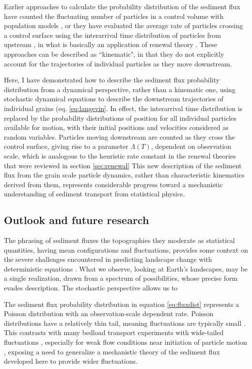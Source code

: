 Earlier approaches to calculate the probability distribution of the sediment flux have counted the fluctuating number of particles in a control volume with population models \citep{Ancey2008,Ancey2014}, or they have evaluated the average rate of particles crossing a control surface using the interarrival time distribution of particles from upstream \citep{Turowski2010,Ancey2020,Heyman2013}, in what is basically an application of renewal theory \citep{Cox1962}.
These approaches can be described as ``kinematic", in that they do not explicitly account for the trajectories of individual particles as they move downstream.

Here, I have demonstrated how to describe the sediment flux probability distribution from a dynamical perspective, rather than a kinematic one, using stochastic dynamical equations to describe the downstream trajectories of individual grains (eq. \ref{eq:langevin}.
In effect, the interarrival time distribution is replaced by the probability distributions of position for all individual particles available for motion, with their initial positions and velocities considered as random variables.
Particles moving downstream are counted as they cross the control surface, giving rise to a parameter $\Lambda(T)$, dependent on observation scale, which is analogous to the heuristic rate constant in the renewal theories that were reviewed in section \ref{sec:renewal} \citep{Turowski2010,Ancey2020}
This new description of the sediment flux from the grain scale particle dynamics, rather than characteristic kinematics derived from them, represents considerable progress toward a mechanistic understanding of sediment transport from statistical physics.

\subsection{Outlook and future research}

The phrasing of sediment fluxes the topographies they moderate as statistical quantities, having mean configurations and fluctuations, provides some context on the severe challenges encountered in predicting landscape change with deterministic equations \citep{}.
What we observe, looking at Earth's landscapes, may be a single realization, drawn from a spectrum of possibilities, whose precise form evades description. 
The stochastic perspective allows us to 

The sediment flux probability distribution in equation \ref{eq:fluxdist} represents a Poisson distribution with an observation-scale dependent rate.
Poisson distributions have a relatively thin tail, meaning fluctuations are typically small \citep{Ancey2006}. This contrasts with many bedload transport experiments with wide-tailed fluctuations \citep{Ancey2008,Heyman2016,Fathel2015}, especially for weak flow conditions near initiation of particle motion \citep{Benavides2021}, exposing a need to generalize a mechanistic theory of the sediment flux developed here to provide wider fluctuations.

